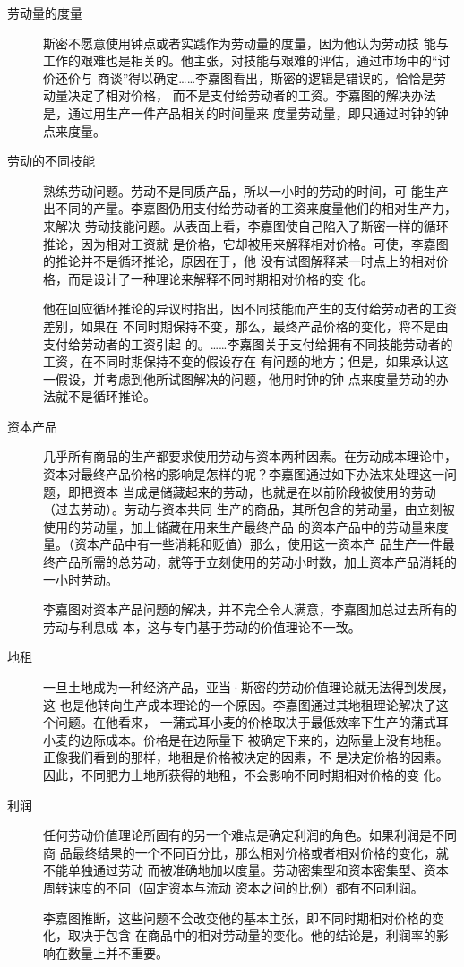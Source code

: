 \begin{description}
\item[劳动量的度量] 斯密不愿意使用钟点或者实践作为劳动量的度量，因为他认为劳动技
  能与工作的艰难也是相关的。他主张，对技能与艰难的评估，通过市场中的“讨价还价与
  商谈”得以确定……李嘉图看出，斯密的逻辑是错误的，恰恰是劳动量决定了相对价格，
  而不是支付给劳动者的工资。李嘉图的解决办法是，通过用生产一件产品相关的时间量来
  度量劳动量，即只通过时钟的钟点来度量。


\item[劳动的不同技能] 熟练劳动问题。劳动不是同质产品，所以一小时的劳动的时间，可
  能生产出不同的产量。李嘉图仍用支付给劳动者的工资来度量他们的相对生产力，来解决
  劳动技能问题。从表面上看，李嘉图使自己陷入了斯密一样的循环推论，因为相对工资就
  是价格，它却被用来解释相对价格。可使，李嘉图的推论并不是循环推论，原因在于，他
  没有试图解释某一时点上的相对价格，而是设计了一种理论来解释不同时期相对价格的变
  化。

  他在回应循环推论的异议时指出，因不同技能而产生的支付给劳动者的工资差别，如果在
  不同时期保持不变，那么，最终产品价格的变化，将不是由支付给劳动者的工资引起
  的。……李嘉图关于支付给拥有不同技能劳动者的工资，在不同时期保持不变的假设存在
  有问题的地方；但是，如果承认这一假设，并考虑到他所试图解决的问题，他用时钟的钟
  点来度量劳动的办法就不是循环推论。


\item[资本产品] 几乎所有商品的生产都要求使用劳动与资本两种因素。在劳动成本理论中，
  资本对最终产品价格的影响是怎样的呢？李嘉图通过如下办法来处理这一问题，即把资本
  当成是储藏起来的劳动，也就是在以前阶段被使用的劳动（过去劳动）。劳动与资本共同
  生产的商品，其所包含的劳动量，由立刻被使用的劳动量，加上储藏在用来生产最终产品
  的资本产品中的劳动量来度量。（资本产品中有一些消耗和贬值）那么，使用这一资本产
  品生产一件最终产品所需的总劳动，就等于立刻使用的劳动小时数，加上资本产品消耗的
  一小时劳动。

  李嘉图对资本产品问题的解决，并不完全令人满意，李嘉图加总过去所有的劳动与利息成
  本，这与专门基于劳动的价值理论不一致。


\item[地租] 一旦土地成为一种经济产品，亚当·斯密的劳动价值理论就无法得到发展，这
  也是他转向生产成本理论的一个原因。李嘉图通过其地租理论解决了这个问题。在他看来，
  一蒲式耳小麦的价格取决于最低效率下生产的蒲式耳小麦的边际成本。价格是在边际量下
  被确定下来的，边际量上没有地租。正像我们看到的那样，地租是价格被决定的因素，不
  是决定价格的因素。因此，不同肥力土地所获得的地租，不会影响不同时期相对价格的变
  化。


\item[利润] 任何劳动价值理论所固有的另一个难点是确定利润的角色。如果利润是不同商
  品最终结果的一个不同百分比，那么相对价格或者相对价格的变化，就不能单独通过劳动
  而被准确地加以度量。劳动密集型和资本密集型、资本周转速度的不同（固定资本与流动
  资本之间的比例）都有不同利润。

  李嘉图推断，这些问题不会改变他的基本主张，即不同时期相对价格的变化，取决于包含
  在商品中的相对劳动量的变化。他的结论是，利润率的影响在数量上并不重要。
\end{description}

